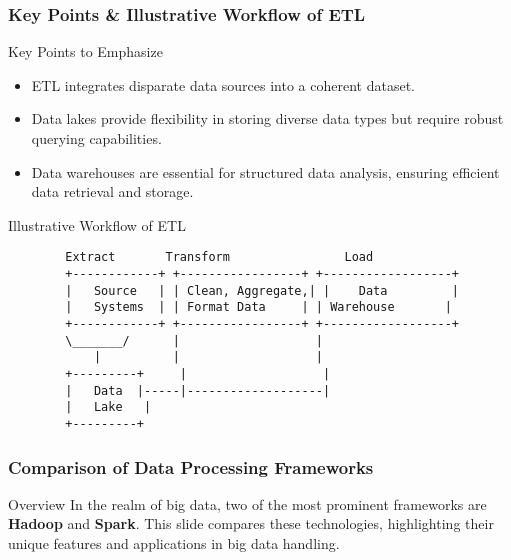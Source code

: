\documentclass[aspectratio=169]{beamer}
\begin{document}
\begin{frame}[fragile]
    \frametitle{Key Points & Illustrative Workflow of ETL}
    \begin{block}{Key Points to Emphasize}
        \begin{itemize}
            \item ETL integrates disparate data sources into a coherent dataset.
            \item Data lakes provide flexibility in storing diverse data types but require robust querying capabilities.
            \item Data warehouses are essential for structured data analysis, ensuring efficient data retrieval and storage.
        \end{itemize}
    \end{block}

    \begin{block}{Illustrative Workflow of ETL}
        \begin{verbatim}
        Extract       Transform                Load
        +------------+ +-----------------+ +------------------+
        |   Source   | | Clean, Aggregate,| |    Data         |
        |   Systems  | | Format Data     | | Warehouse       |
        +------------+ +-----------------+ +------------------+
        \_______/      |                   |
            |          |                   |
        +---------+     |                   |
        |   Data  |-----|-------------------|
        |   Lake   |     
        +---------+
        \end{verbatim}
    \end{block}
\end{frame}

\begin{frame}[fragile]
    \frametitle{Comparison of Data Processing Frameworks}
    \begin{block}{Overview}
        In the realm of big data, two of the most prominent frameworks are \textbf{Hadoop} and \textbf{Spark}. 
        This slide compares these technologies, highlighting their unique features and applications in big data handling.
    \end{block}
\end{frame}
\end{document}
